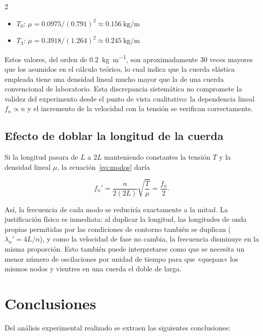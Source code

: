 \documentclass[12pt,a4paper]{article}
\begin{document}
\begin{multicols}{2}
\begin{itemize}
  \item $T_0$: $\mu = 0.0975 / (0.791)^2 \approx \SI{0.156}{\kilogram\per\metre}$
  \item $T_3$: $\mu = 0.3918 / (1.264)^2 \approx \SI{0.245}{\kilogram\per\metre}$
\end{itemize}

Estos valores, del orden de \SI{0.2}{\kilogram\per\metre}, son aproximadamente 30 veces mayores que los asumidos en el cálculo teórico, lo cual indica que la cuerda elástica empleada tiene una densidad lineal mucho mayor que la de una cuerda convencional de laboratorio. Esta discrepancia sistemática no compromete la validez del experimento desde el punto de vista cualitativo: la dependencia lineal $f_n \propto n$ y el incremento de la velocidad con la tensión se verifican correctamente.

\subsection{Efecto de doblar la longitud de la cuerda}

Si la longitud pasara de $L$ a $2L$ manteniendo constantes la tensión $T$ y la densidad lineal $\mu$, la ecuación~\eqref{eq:modos} daría

\begin{equation}
  f_n' = \frac{n}{2(2L)}\sqrt{\frac{T}{\mu}} = \frac{f_n}{2}.
  \label{eq:2L}
\end{equation}

Así, la frecuencia de cada modo se reduciría exactamente a la mitad. La justificación física es inmediata: al duplicar la longitud, las longitudes de onda propias permitidas por las condiciones de contorno también se duplican ($\lambda_n' = 4L/n$), y como la velocidad de fase no cambia, la frecuencia disminuye en la misma proporción. Esto también puede interpretarse como que se necesita un menor número de oscilaciones por unidad de tiempo para que «quepan» los mismos nodos y vientres en una cuerda el doble de larga.

\section{Conclusiones}

Del análisis experimental realizado se extraen las siguientes conclusiones:


\end{multicols}
\end{document}
